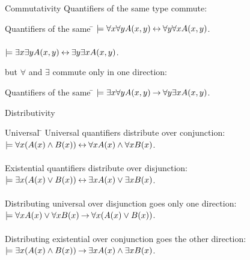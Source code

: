 \begin{wideslide}[bm=,toc=]{Commutativity}
Quantifiers of the same type commute:
\pause
\begin{tabbing}
Quantifiers of the same \= \kill
\> $\models \forall x \forall y A(x,y) \mathbin{\leftrightarrow} \forall y \forall x A(x,y)$.\\
\pause
\> ~\\ 
\> $\models \exists x \exists y A(x,y) \mathbin{\leftrightarrow} \exists y \exists x A(x,y)$.\\
\end{tabbing}

\pause
but $\forall$ and $\exists$ commute only in one direction:
\pause
\begin{tabbing}
Quantifiers of the same \= \kill
\> $\models \exists x \forall y A(x,y) \mathbin{\rightarrow} \forall y \exists x A(x,y)$.\\
\end{tabbing}

\end{wideslide}

\begin{wideslide}[bm=,toc=]{Distributivity}
\begin{tabbing}
Universal \= \kill
Universal quantifiers distribute over conjunction:  \> \\[2mm]
\pause
\>$\models \forall x(A(x) \land B(x)) \mathbin{\leftrightarrow} \forall x A(x) \land \forall x B(x)$.\\
~\\
\pause
Existential quantifiers distribute over disjunction:\\[2mm]
\pause
\>$\models \exists x(A(x) \lor B(x)) \mathbin{\leftrightarrow} \exists x A(x) \lor \exists x B(x)$.\\
~\\
\pause
Distributing universal over disjunction goes only one direction:\\[2mm]
\pause
\>$\models \forall x A(x) \lor \forall x B(x) \mathbin{\rightarrow} \forall x(A(x) \lor B(x))$.\\
~\\
\pause
Distributing existential over conjunction goes the other direction:\\[2mm]
\pause
\>$\models \exists x(A(x) \land B(x)) \mathbin{\rightarrow} \exists x A(x) \land \exists x B(x)$.\\
\end{tabbing}

\end{wideslide}

